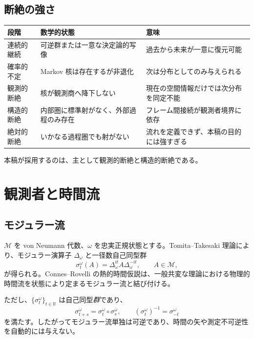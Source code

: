 \documentclass[a4paper,11pt]{ltjsarticle}
\theoremstyle{remark}
\newcommand{\M}{\mathcal{M}}
\newcommand{\R}{\mathbb{R}}
\begin{document}
\subsection{断絶の強さ}
\begin{longtable}{>{\raggedright\arraybackslash}p{28mm}>{\raggedright\arraybackslash}p{48mm}>{\raggedright\arraybackslash}p{63mm}}
\toprule
段階 & 数学的状態 & 意味 \\
\midrule
連続的継続 & 可逆群または一意な決定論的写像 & 過去から未来が一意に復元可能 \\
確率的不定 & Markov 核は存在するが非退化 & 次は分布としてのみ与えられる \\
観測的断絶 & 核が観測商へ降下しない & 現在の空間情報だけでは次分布を同定不能 \\
構造的断絶 & 内部圏に標準射がなく、外部過程のみ存在 & フレーム間接続が観測者境界に依存 \\
絶対的断絶 & いかなる過程圏でも射がない & 流れを定義できず、本稿の目的には強すぎる \\
\bottomrule
\end{longtable}
本稿が採用するのは、主として観測的断絶と構造的断絶である。

\section{観測者と時間流}

\subsection{モジュラー流}
$\M$ を von Neumann 代数、$\omega$ を忠実正規状態とする。Tomita--Takesaki 理論により、モジュラー演算子 $\Delta_\omega$ と一径数自己同型群
\begin{equation}
 \sigma_t^\omega(A)
 =\Delta_\omega^{it}A\Delta_\omega^{-it},
 \qquad A\in\M,
 \label{eq:modularflow}
\end{equation}
が得られる。Connes--Rovelli の熱的時間仮説は、一般共変な理論における物理的時間流を状態により定まるモジュラー流と結び付ける\cite{ConnesRovelli1994}。

ただし、$\{\sigma_t^\omega\}_{t\in\R}$ は自己同型\emph{群}であり、
\begin{equation}
 \sigma_{t+s}^\omega=\sigma_t^\omega\circ\sigma_s^\omega,
 \qquad (\sigma_t^\omega)^{-1}=\sigma_{-t}^\omega
\end{equation}
を満たす。したがってモジュラー流単独は可逆であり、時間の矢や測定不可逆性を自動的には与えない。
\end{document}
